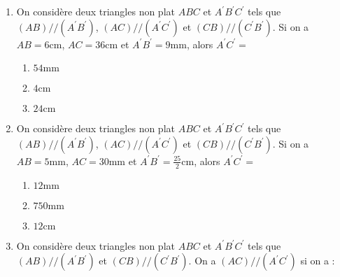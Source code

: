 \documentclass[oneside,twoside]{book}
\begin{document}
\begin{enumerate}
\begin{enumerate}
\end{enumerate}



\item On considère deux triangles non plat $ABC$ et $A^\prime B^\prime C^\prime$ tels que $\left(AB\right)//\left(A^{\prime}B^{\prime}\right)$, $\left(AC\right)//\left(A^{\prime}C^{\prime}\right)$ et $\left(CB\right)//\left(C^{\prime}B^{\prime}\right)$. Si on a $AB=6\mathrm{cm}$, $AC=36\mathrm{cm}$ et $A^{\prime}B^{\prime}=9\mathrm{mm}$, alors $A^{\prime}C^{\prime}=$

\begin{enumerate}

\item\BonneReponse $54\mathrm{mm}$

\item\MauvaiseReponse $4\mathrm{cm}$

\item\MauvaiseReponse $24\mathrm{cm}$

\end{enumerate}



\item On considère deux triangles non plat $ABC$ et $A^\prime B^\prime C^\prime$ tels que $\left(AB\right)//\left(A^{\prime}B^{\prime}\right)$, $\left(AC\right)//\left(A^{\prime}C^{\prime}\right)$ et $\left(CB\right)//\left(C^{\prime}B^{\prime}\right)$. Si on a $AB=5\mathrm{mm}$, $AC=30\mathrm{mm}$ et $A^{\prime}B^{\prime}=\frac{25}{2}\mathrm{cm}$, alors $A^{\prime}C^{\prime}=$

\begin{enumerate}


\item\MauvaiseReponse $12\mathrm{mm}$
\item\BonneReponse $750\mathrm{mm}$

\item\MauvaiseReponse $12\mathrm{cm}$

\end{enumerate}





\item On considère deux triangles non plat $ABC$ et $A^\prime B^\prime C^\prime$ tels que $\left(AB\right)//\left(A^{\prime}B^{\prime}\right)$ et $\left(CB\right)//\left(C^{\prime}B^{\prime}\right)$. On a $\left(AC\right)//\left(A^{\prime}C^{\prime}\right)$ si on a :

\begin{enumerate}



\end{enumerate}
\end{enumerate}
\end{document}

